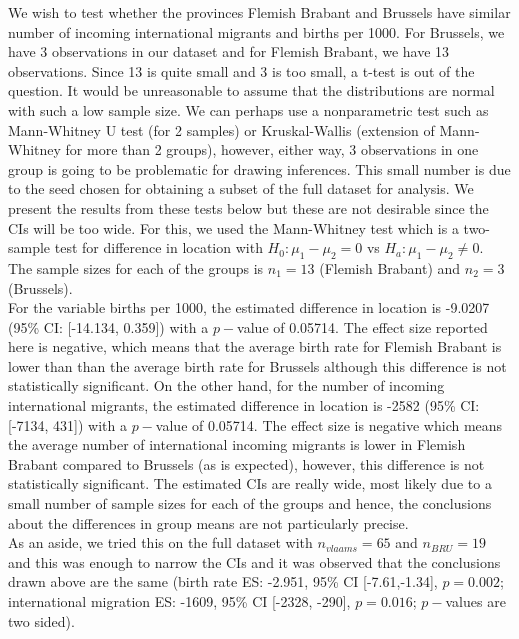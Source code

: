 \documentclass[paper=a4, fontsize=11pt]{scrartcl} %
\numberwithin{equation}{section} %
\begin{document}
We wish to test whether the provinces Flemish Brabant and Brussels have similar number of incoming international migrants and births per 1000. For Brussels, we have 3 observations in our dataset and for Flemish Brabant, we have 13 observations. Since 13 is quite small and 3 is too small, a t-test is out of the question. It would be unreasonable to assume that the distributions are normal with such a low sample size. We can perhaps use a nonparametric test such as Mann-Whitney U test (for 2 samples) or Kruskal-Wallis (extension of Mann-Whitney for more than 2 groups), however, either way, 3 observations in one group is going to be problematic for drawing inferences. This small number is due to the seed chosen for obtaining a subset of the full dataset for analysis. We present the results from these tests below but these are not desirable since the CIs will be too wide. For this, we used the Mann-Whitney test which is a two-sample test for difference in location with $H_0: \mu_1 - \mu_2 = 0$ vs $H_a: \mu_1 - \mu_2 \neq 0$. The sample sizes for each of the groups is $n_1 = 13$ (Flemish Brabant) and $n_2 = 3$ (Brussels).\\ 

For the variable births per 1000, the estimated difference in location is -9.0207 (95\% CI: [-14.134, 0.359]) with a $p-$value of 0.05714. The effect size reported here is negative, which means that the average birth rate for Flemish Brabant is lower than than the average birth rate for Brussels although this difference is not statistically significant. On the other hand, for the number of incoming international migrants, the estimated difference in location is -2582 (95\% CI: [-7134, 431]) with a $p-$value of 0.05714. The effect size is negative which means the average number of international incoming migrants is lower in Flemish Brabant compared to Brussels (as is expected), however, this difference is not statistically significant. The estimated CIs are really wide, most likely due to a small number of sample sizes for each of the groups and hence, the conclusions about the differences in group means are not particularly precise. \\

As an aside, we tried this on the full dataset with $n_{vlaams}=65$ and $n_{BRU}=19$ and this was enough to narrow the CIs and it was observed that the conclusions drawn above are the same (birth rate ES: -2.951, 95\% CI [-7.61,-1.34], $p = 0.002$; international migration ES: -1609, 95\% CI [-2328, -290], $p = 0.016$; $p-$values are two sided).
\end{document}

